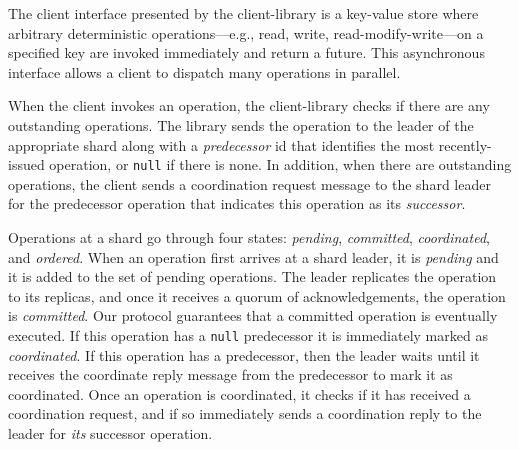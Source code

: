 
The client interface presented by the client-library is a key-value store where arbitrary deterministic operations---e.g., read, write, read-modify-write---on a specified key are invoked immediately and return a future.
This asynchronous interface allows a client to dispatch many operations in parallel.

When the client invokes an operation, the client-library checks if there are any
outstanding operations.  The library sends the operation to the leader of the
appropriate shard along with a \textit{predecessor} id that identifies the most
recently-issued operation, or \texttt{null} if there is none.  In addition, when
there are outstanding operations, the client sends a coordination request
message to the shard leader for the predecessor operation that indicates this
operation as its \textit{successor}.




Operations at a shard go through four states:
\textit{pending},
\textit{committed},
\textit{coordinated},
and
\textit{ordered}.
When an operation first arrives at a shard leader, it is \textit{pending} and it is added to the set of pending operations.
The leader replicates the operation to its replicas, and once it receives a quorum of acknowledgements,
the operation is \textit{committed}.
Our protocol guarantees that a committed operation is eventually executed.
If this operation has a \texttt{null} predecessor it is immediately marked as \textit{coordinated}.
If this operation has a predecessor, then the leader waits until it receives the coordinate reply message from the predecessor to mark it as coordinated.
Once an operation is coordinated, it checks if it has received a coordination request, and if so immediately sends a coordination reply to the leader for \textit{its} successor operation.

